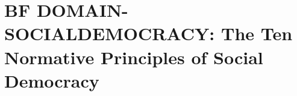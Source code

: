 \section{BF DOMAIN-SOCIALDEMOCRACY: The Ten Normative Principles of Social Democracy}
\label{app:bf-domain-socialdemocracy}


\begin{abstract}

Social democracy rests on ten foundational normative principles that translate abstract ethical commitments (``fairness,'' ``solidarity,'' ``universalism'') into concrete policy mechanisms (minimum wage laws, progressive taxation, public insurance, workplace codetermination). This appendix articulates each principle in its normative-to-policy form and traces how their absence in Austria (1981-2015) contributed to media concentration and the rise of populism. The Babler case study (2025) demonstrates that these principles remain viable policy tools even when previously neglected, provided regulatory implementation occurs.

\end{abstract}


